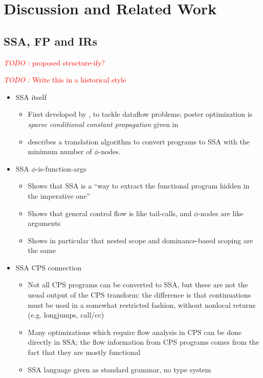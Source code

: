 \documentclass[acmsmall,screen,review]{acmart}
\newcounter{todos}
\newcommand{\TODO}[1]{{
  \stepcounter{todos}
  \begin{center}\large{\textcolor{red}{\emph{TODO \arabic{todos}:} #1}}\end{center}
}}
\begin{document}
\section{Discussion and Related Work}

\subsection{SSA, FP and IRs}

\TODO{proposed structure-ify?}

\TODO{Write this in a historical style}
\begin{itemize}
  \item SSA itself
  \begin{itemize}
    \item First developed by \citet{alpern-ssa-original-88}, \citet{rosen-gvn-1988} to tackle
    dataflow problems; poster optimization is \emph{sparse conditional constant propagation} given
    in
    \citet{wegman-sccp-91}
    \item \citet{cytron-ssa-intro-91} describes a translation algorithm to convert programs to SSA
    with the minimum number of $\phi$-nodes.
  \end{itemize}
  \item SSA $\phi$-is-function-args \citet{appel-ssa}
  \begin{itemize}
    \item Shows that SSA is a ``way to extract the functional program hidden in the imperative one''
    \item Shows that general control flow is like tail-calls, and $\phi$-nodes are like arguments
    \item Shows in particular that nested scope and dominance-based scoping are the same
  \end{itemize}
  \item SSA CPS connection \citet{kelsey-95-cps}
  \begin{itemize}
    \item Not all CPS programs can be converted to SSA, but these are not the usual output of the
    CPS transform: the difference is that continuations must be used in a somewhat restricted
    fashion, without nonlocal returns (e.g. longjumps, call/cc)
    \item Many optimizations which require flow analysis in CPS can be done directly in SSA; the
    flow information from CPS programs comes from the fact that they are mostly functional
    \item SSA language given as standard grammar, no type system

\end{itemize}
\end{itemize}
\end{document}
